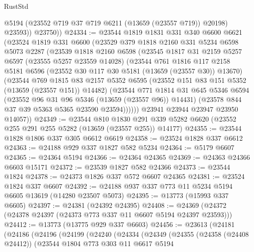 \begin{lexlean}{RustStd}
\begin{coremodule}
            @5194
            (@23552 @719 @37 @719 @6211 (@13659 (@23557 @719)) @20198)
            @23593))
        @23750))
@24334 := @23544
    @1819
    @1831
    @331
    @340
    @6600
    @6621
    (@23524
      @1819
      @331
      @6600
      (@23529
        @379
        @1818
        @2160
        @331
        @5234
        @6598
        @5073
        @2287
        (@23539
          @1818
          @2160
          @6598
          (@23545
            @1817
            @31
            @2159
            @5257
            @6597
            (@23555 @5257 @23559 @14028)
            (@23544
              @761
              @1816
              @117
              @2158
              @5181
              @6596
              (@23552 @30 @117 @30 @5181 (@13659 (@23557 @30)) @13670)
              (@23544
                @769
                @1815
                @83
                @2157
                @5352
                @6595
                (@23552 @151 @83 @151 @5352 (@13659 (@23557 @151)) @14482)
                (@23544
                  @771
                  @1814
                  @31
                  @645
                  @5346
                  @6594
                  (@23552 @96 @31 @96 @5346 (@13659 (@23557 @96)) @14431)
                  (@23578 @844 @37 @39 @5363 @5365 @23590 @23594))))))
        @23941
        @23944
        @23947
        @23950
        @14057))
@24349 := @23544
    @810
    @1830
    @291
    @339
    @5282
    @6620
    (@23552 @255 @291 @255 @5282 (@13659 (@23557 @255)) @14177)
@24355 := @23544 @1828 @1806 @337 @305 @6612 @6619
@24358 := @23524 @1828 @337 @6612
@24363 := @24188 @929 @337 @1827 @582 @5234
@24364 := @5179 @6607
@24365 := @24364 @5194
@24366 := @24364 @24365
@24369 := @24363 @24366 @6603 @15171
@24372 := @23539 @1827 @582 @24366
@24373 := @23544 @1824
@24378 := @24373 @1826 @337 @572 @6607 @24365
@24381 := @23524 @1824 @337 @6607
@24392 := @24188 @937 @337 @773 @11 @5234 @5194 @6605 @13619 (@14280 @23507 @5073)
@24395 := @13773 (@15993 @337 @6605)
@24397 := @24381 (@24392 @24395)
@24408 := @24369 (@24372 (@24378 @24397 (@24373 @773 @337 @11 @6607 @5194 @24397 @23593)))
@24412 := @13773 (@13775 @929 @337 @6603)
@24456 := @23613
    (@24181
      (@24186
        (@24196
          (@24199
            (@24240
              (@24334
                (@24349
                  (@24355
                    (@24358 (@24408 @24412))
                    (@23544
                      @1804
                      @773
                      @303
                      @11
                      @6617
                      @5194

\end{coremodule}
\end{lexlean}
